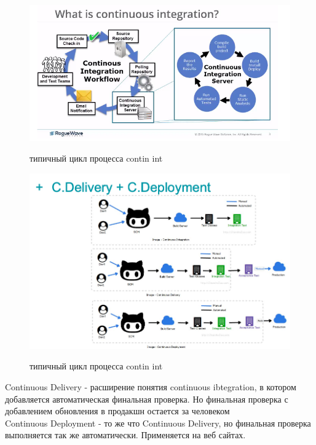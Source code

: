\documentclass[12pt; a4paper]{book}
\theoremstyle{plain} %
\theoremstyle{defenition}
\theoremstyle{remark}
\begin{document}
\begin{figure}[!htbp]
\includegraphics[angle=0, width=\textwidth]{IMG/18} \\
\caption{типичный цикл процесса contin int}
\end{figure}

\newpage
\begin{figure}[!htbp]
\includegraphics[angle=0, width=\textwidth]{IMG/19} \\
\caption{типичный цикл процесса contin int}
\end{figure}
Continuous Delivery - расширение понятия continuous ibtegration, в котором добавляется автоматическая финальная проверка. Но финальная проверка с добавлением обновления в продакшн остается за человеком\\
Continuous Deployment - то же что Continuous Delivery, но финальная проверка выполняется так же автоматически. Применяется на веб сайтах.


\newpage
\end{document}
